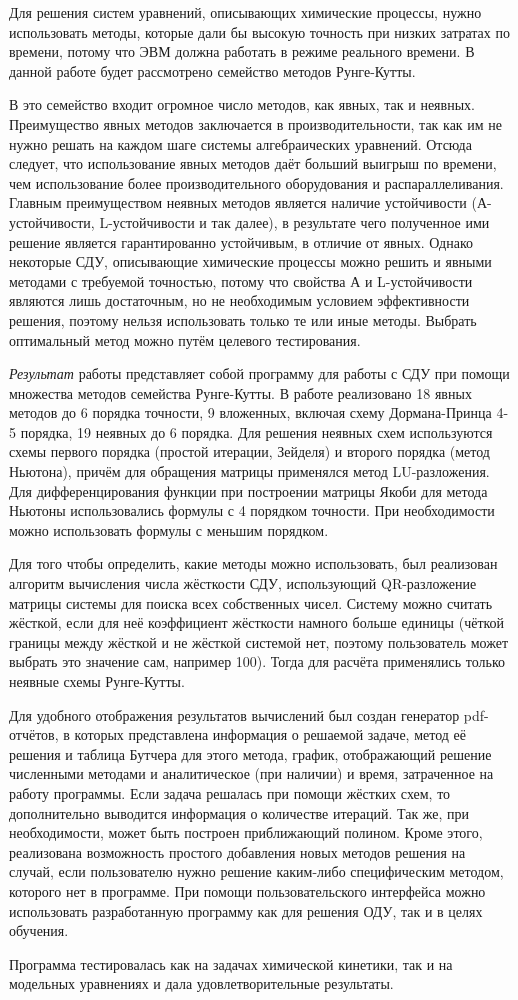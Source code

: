 \introduction %

Для решения систем уравнений, описывающих химические процессы, нужно использовать методы, которые дали бы высокую точность при низких
затратах по времени, потому что ЭВМ должна работать в режиме реального времени. В данной работе будет рассмотрено семейство методов
Рунге-Кутты.

В это семейство входит огромное число методов, как явных, так и неявных. Преимущество явных методов заключается в производительности,
так как им не нужно решать на каждом шаге системы алгебраических уравнений. Отсюда следует, что использование явных методов даёт
больший выигрыш по времени, чем использование более производительного оборудования и распараллеливания. Главным преимуществом неявных
методов является наличие устойчивости (А-устойчивости, L-устойчивости и так далее), в результате чего полученное ими решение является
гарантированно устойчивым, в отличие от явных. Однако некоторые СДУ, описывающие химические процессы можно решить и явными методами с
требуемой точностью, потому что свойства А и L-устойчивости являются лишь достаточным, но не необходимым условием эффективности
решения, поэтому нельзя использовать только те или иные методы. Выбрать оптимальный метод можно путём целевого тестирования.

\textit{Результат} работы представляет собой программу для работы с СДУ при помощи множества методов семейства Рунге-Кутты. В работе
реализовано 18 явных методов до 6 порядка точности, 9 вложенных, включая схему Дормана-Принца 4-5 порядка, 19 неявных до 6 порядка. Для  решения неявных схем используются схемы первого порядка (простой итерации, Зейделя) и второго порядка
(метод Ньютона), причём для обращения матрицы применялся метод LU-разложения. Для дифференцирования функции при построении
матрицы Якоби для метода Ньютоны использовались формулы с 4 порядком точности. При необходимости можно использовать формулы
с меньшим порядком.

Для того чтобы определить, какие методы можно использовать, был реализован алгоритм вычисления числа жёсткости СДУ,
использующий QR-разложение матрицы системы для поиска всех собственных чисел. Систему можно считать жёсткой, если для
неё коэффициент жёсткости намного больше единицы (чёткой границы между жёсткой и не жёсткой системой нет, поэтому пользователь
может выбрать это значение сам, например 100). Тогда для расчёта применялись только неявные схемы Рунге-Кутты.

Для удобного отображения результатов вычислений был создан генератор pdf-отчётов, в которых представлена информация о решаемой
задаче, метод её решения и таблица Бутчера для этого метода, график, отображающий решение численными методами и аналитическое
(при наличии) и время, затраченное на работу программы. Если задача решалась при помощи жёстких схем, то дополнительно выводится
информация о количестве итераций. Так же, при необходимости, может быть построен приближающий полином. Кроме этого, реализована
возможность простого добавления новых методов решения на случай, если пользователю нужно решение каким-либо специфическим методом,
которого нет в программе. При помощи пользовательского интерфейса можно использовать разработанную программу как для решения ОДУ, так
и в целях обучения.

Программа тестировалась как на задачах химической кинетики, так и на модельных уравнениях и дала удовлетворительные результаты.